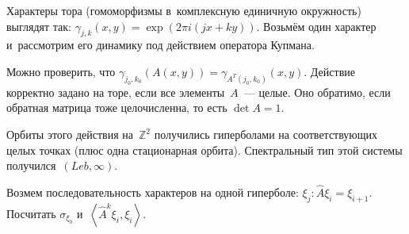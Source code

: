 \documentclass{article}
\begin{document}
Характеры тора (гомоморфизмы в~комплексную единичную окружность) выглядят так:
$\gamma_{j,k}(x, y) = \exp(2\pi i(jx + ky))$. Возьмём один характер и~рассмотрим
его динамику под действием оператора Купмана.

Можно проверить, что $\gamma_{j_0,k_0}(A(x, y)) = \gamma_{A^T(j_0,k_0)}(x, y)$.
Действие корректно задано на торе, если все элементы~$A$~--- целые. Оно
обратимо, если обратная матрица тоже целочисленна, то есть $\det A = 1$.

Орбиты этого действия на~$\mathbb{Z}^2$ получились гиперболами на
соответствующих целых точках (плюс одна стационарная орбита). Спектральный тип
этой системы получился~$(Leb, \infty)$.

\begin{exercise}
	Возмем последовательность характеров на одной гиперболе: $\xi_j: \hat A\xi_i =
	\xi_{i+1}$. Посчитать $\sigma_{\xi_0}$ и~$\left<\hat A^k \xi_i, \xi_i
	\right>$.
\end{exercise}
\end{document}
